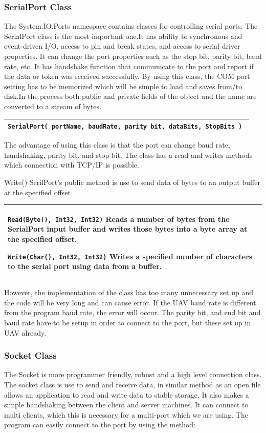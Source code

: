 \documentclass[oneside]{ecsgdp}         %
\begin{document}
\subsubsection{SerialPort Class}
The System.IO.Ports namespace contains classes for controlling serial ports. The SerialPort class is the most important one.It has ability to synchronous and event-driven I/O, access to pin and break states, and access to serial driver properties\cite{peak_netFrame}. It can change the port properties such as the stop bit, parity bit, baud rate, etc. It has handshake function that communicate to the port and report if the data or token was received successfully.
By using this class, the COM port setting has to be memorized which will be simple to load and saves from/to disk.In the process both public and private fields of the object and the name are converted to a stream of bytes.

\begin{tabular}{|p{14.5cm}|}
\hline
\texttt{SerialPort( portName, baudRate, parity bit, dataBits, StopBits ) }
\\
\hline
\end{tabular} 


The advantage of using this class is that the port can change baud rate, handshaking, parity bit, and stop bit. The class has a read and writes methods which connection with TCP/IP is possible.

Write() SerilPort's public method is use to send data of bytes to an output buffer at the specified offset

\begin{tabular}{|p{14.5cm}|}
\hline
\texttt{Read(Byte(), Int32, Int32)}
	 	Reads a number of bytes from the SerialPort input buffer and writes those bytes into a byte array at the specified offset.
	
	
\texttt{Write(Char(), Int32, Int32)} 	
Writes a specified number of characters to the serial port using data from a buffer.
	
	
\\
\hline
\end{tabular} 


 However, the implementation of the class has too many unnecessary set up and the code will be very long and can cause error. If the UAV baud rate is different from the program baud rate, the error will occur. The parity bit, and end bit and baud rate have to be setup in order to connect to the port, but these set up in UAV already.
\subsubsection{Socket Class}
The Socket is more programmer friendly, robust and a high level connection class. The socket class is use to send and receive data, in similar method as an open file allows an application to read and write data to stable storage.  It also makes a simple handshaking between the client and server machines. It can connect to multi clients, which this is necessary for a multi-port which we are using. The program can easily connect to the port by using the method:
\end{document}

